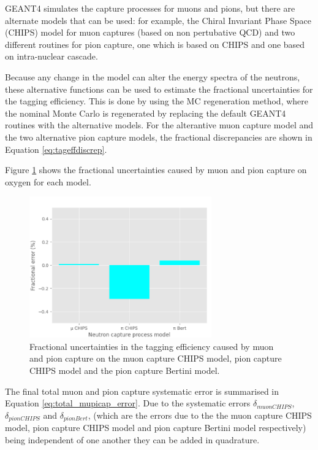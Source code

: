 GEANT4 simulates the capture processes for muons and pions, but there are alternate models that can be used: for example, the Chiral Invariant Phase Space (CHIPS) model for muon captures (based on non pertubative QCD) and two different routines for pion capture, one which is based on CHIPS and one based on intra-nuclear cascade.

Because any change in the model can alter the energy spectra of the neutrons, these alternative functions can be used to estimate the fractional uncertainties for the tagging efficiency. This is done by using the MC regeneration method, where the nominal Monte Carlo is regenerated by replacing the default GEANT4 routines with the alternative models. For the alterantive muon capture model and the two alternative pion capture models, the fractional discrepancies are shown in Equation \ref{eq:tageffdiscrep}.

Figure \ref{fig:mupicap_uncertainty} shows the fractional uncertainties caused by muon and pion capture on oxygen for each model.

\begin{figure}[!htb]
\centering
    \includegraphics[width=0.7\textwidth]{Figures/mupicap_uncertainty.png}
\caption{Fractional uncertainties in the tagging efficiency caused by muon and pion capture on the muon capture CHIPS model, pion capture CHIPS model and the pion capture Bertini model.}
\label{fig:mupicap_uncertainty}
\end{figure}

The final total muon and pion capture systematic error is summarised in Equation \ref{eq:total_mupicap_error}. Due to the systematic errors $\delta_{muon C H I P S}$, $\delta_{pion C H I P S}$ and $\delta_{pion B e r t}$, (which are the errors due to the the muon capture CHIPS model, pion capture CHIPS model and pion capture Bertini model respectively) being independent of one another they can be added in quadrature.

